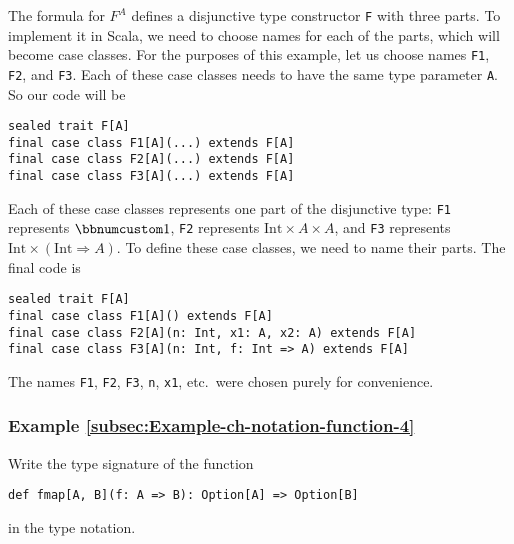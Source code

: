 The formula for $F^{A}$ defines a disjunctive type constructor \lstinline!F!
with three parts. To implement it in Scala, we need to choose names
for each of the parts, which will become case classes. For the purposes
of this example, let us choose names \lstinline!F1!,
\lstinline!F2!, and \lstinline!F3!.
Each of these case classes needs to have the same type parameter \lstinline!A!.
So our code will be
\begin{lstlisting}
sealed trait F[A]
final case class F1[A](...) extends F[A]
final case class F2[A](...) extends F[A]
final case class F3[A](...) extends F[A]
\end{lstlisting}
Each of these case classes represents one part of the disjunctive
type: \lstinline!F1! represents
$\bbnum 1$, \lstinline!F2!
represents $\text{Int}\times A\times A$, and \lstinline!F3!
represents $\text{Int}\times\left(\text{Int}\Rightarrow A\right)$.
To define these case classes, we need to name their parts. The final
code is
\begin{lstlisting}
sealed trait F[A]
final case class F1[A]() extends F[A]
final case class F2[A](n: Int, x1: A, x2: A) extends F[A]
final case class F3[A](n: Int, f: Int => A) extends F[A]
\end{lstlisting}
The names \lstinline!F1!,
\lstinline!F2!, \lstinline!F3!,
\lstinline!n!, \lstinline!x1!,
etc.~were chosen purely for convenience.

\subsubsection{Example \label{subsec:Example-ch-notation-function-4}\ref{subsec:Example-ch-notation-function-4}}

Write the type signature of the function
\begin{lstlisting}
def fmap[A, B](f: A => B): Option[A] => Option[B]
\end{lstlisting}
in the type notation.

